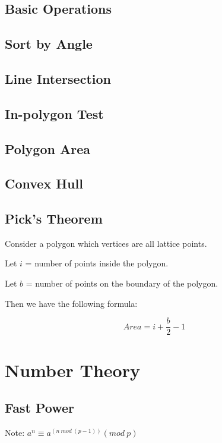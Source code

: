 \documentclass[twocolumn]{article}
\begin{document}
\subsection{Basic Operations}


\subsection{Sort by Angle}


\subsection{Line Intersection}


\subsection{In-polygon Test}


\subsection{Polygon Area}


\subsection{Convex Hull}


\subsection{Pick's Theorem}

Consider a polygon which vertices are all lattice points.

Let $i$ = number of points inside the polygon.

Let $b$ = number of points on the boundary of the polygon.

Then we have the following formula:

$$
Area = i + \frac{b}{2} - 1
$$

\section{Number Theory}

\subsection{Fast Power}
Note: $a^n \equiv a^{(n \ mod \ (p-1))} (mod \ p)$
\end{document}
